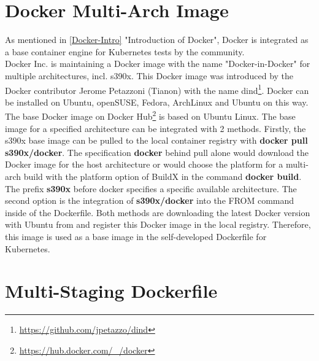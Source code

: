 \section{Docker Multi-Arch Image}
As mentioned in \ref{Docker-Intro} "Introduction of Docker", Docker is integrated as a base container engine for Kubernetes tests by the community. \\  
Docker Inc. is maintaining a Docker image with the name "Docker-in-Docker" for multiple architectures, incl. s390x. 
This Docker image was introduced by the Docker contributor Jerome Petazzoni (Tianon) with the name dind\footnote{\url{https://github.com/jpetazzo/dind}}. Docker can be installed on Ubuntu, openSUSE, Fedora, ArchLinux and Ubuntu on this way.
The base Docker image on Docker Hub\footnote{\url{https://hub.docker.com/_/docker}} is based on Ubuntu Linux.
The base image for a specified architecture can be integrated with 2 methods. Firstly, the s390x base image can be pulled to the local container registry with \textbf{docker pull s390x/docker}. The specification \textbf{docker} behind pull alone would download the Docker image for the host architecture or would choose the platform for a multi-arch build with the platform option of BuildX in the command \textbf{docker build}. The prefix \textbf{s390x} before docker specifies a specific available architecture. 
The second option is the integration of \textbf{s390x/docker} into the FROM command inside of the Dockerfile. Both methods are downloading the latest Docker version with Ubuntu from  and register this Docker image in the local registry.
Therefore, this image is used as a base image in the self-developed Dockerfile for Kubernetes.



\section{Multi-Staging Dockerfile}

